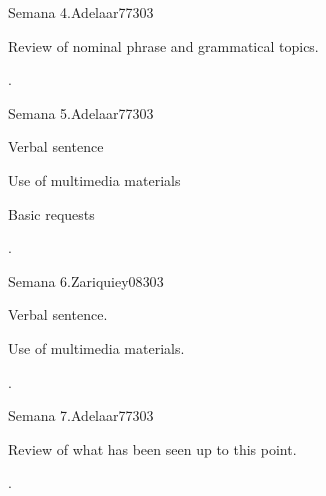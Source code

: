 \begin{syllabus}
\begin{unit}{}{Semana 4.}{Adelaar77}{30}{3}
   \begin{topics}
      \item Review of nominal phrase and grammatical topics.
   \end{topics}

   \begin{learningoutcomes}
      \item .
   \end{learningoutcomes}
\end{unit}

\begin{unit}{}{Semana 5.}{Adelaar77}{30}{3}
   \begin{topics}
      \item Verbal sentence
      \item Use of multimedia materials
      \item Basic requests
   \end{topics}

   \begin{learningoutcomes}
      \item .
   \end{learningoutcomes}
\end{unit}

\begin{unit}{}{Semana 6.}{Zariquiey08}{30}{3}
   \begin{topics}
      \item Verbal sentence.
      \item Use of multimedia materials.
   \end{topics}

   \begin{learningoutcomes}
      \item .
   \end{learningoutcomes}
\end{unit}

\begin{unit}{}{Semana 7.}{Adelaar77}{30}{3}
   \begin{topics}
      \item Review of what has been seen up to this point.
   \end{topics}

   \begin{learningoutcomes}
      \item .
   \end{learningoutcomes}
\end{unit}


\end{syllabus}
